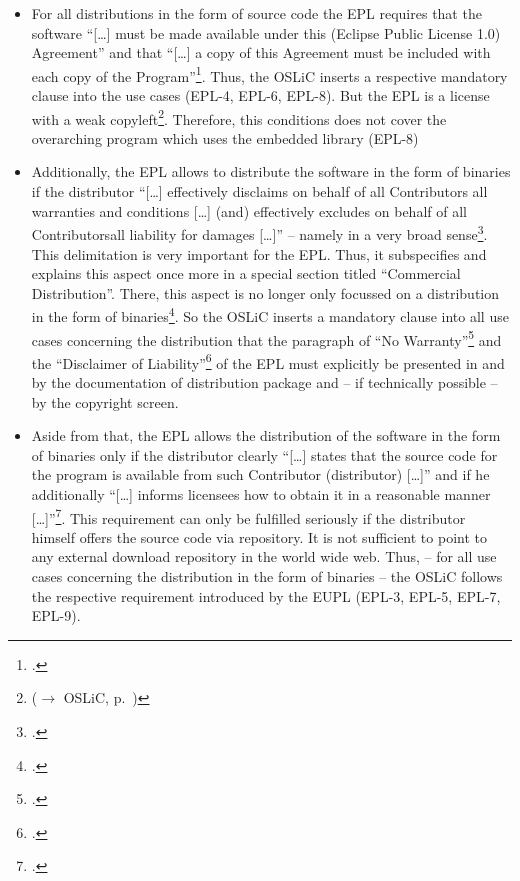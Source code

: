 \begin{itemize}
  \item For all distributions in the form of source code the EPL requires that
  the software \enquote{[\ldots] must be made available under this (Eclipse
  Public License 1.0) Agreement} and that \enquote{[\ldots] a copy of this
  Agreement must be included with each copy of the
  Program}\footcite[cf.][\nopage wp\ §3]{Epl10OsiLicense2005a}. Thus, the OSLiC
  inserts a respective mandatory clause into the use cases (EPL-4, EPL-6,
  EPL-8). But the EPL is a license with a weak copyleft\footnote{($\rightarrow$
  OSLiC, p.\ \pageref{sec:ProtectingPowerOfEpl})}. Therefore, this conditions
  does not cover the overarching program which uses the embedded library (EPL-8)
  
  \item Additionally, the EPL allows to distribute the software in the form
  of binaries if the distributor \enquote{[\ldots] effectively disclaims on
  behalf of all Contributors all warranties and conditions [\ldots] (and)
  effectively excludes on behalf of all Contributorsall liability for damages
  [\ldots]} -- namely in a very broad sense\footcite[cf.][\nopage wp\
  §3]{Epl10OsiLicense2005a}. This delimitation is very important for the EPL.
  Thus, it subspecifies and explains this aspect once more in a special section
  titled \enquote{Commercial Distribution}. There, this aspect is no longer only
  focussed on a distribution in the form of binaries\footcite[cf.][\nopage wp\
  §4]{Epl10OsiLicense2005a}. So the OSLiC inserts a mandatory clause into all
  use cases concerning the distribution that the paragraph of \enquote{No
  Warranty}\footcite[cf.][\nopage wp\ §5]{Epl10OsiLicense2005a} and the
  \enquote{Disclaimer of Liability}\footcite[cf.][\nopage wp\
  §6]{Epl10OsiLicense2005a} of the EPL must explicitly be presented in and by
  the documentation of distribution package
  and -- if technically possible -- by the copyright screen.
  
  \item Aside from that, the EPL allows the distribution of the software in the
  form of binaries only if the distributor clearly \enquote{[\ldots] states that
  the source code for the program is available from such Contributor
  (distributor) [\ldots]} and if he additionally \enquote{[\ldots] informs
  licensees how to obtain it in a reasonable manner
  [\ldots]}\footcite[cf.][\nopage wp\ §3]{Epl10OsiLicense2005a}. This
  requirement can only be fulfilled seriously if the distributor himself offers
  the source code via repository. It is not sufficient to point to any external
  download repository in the world wide web. Thus, -- for all use cases
  concerning the distribution in the form of binaries -- the OSLiC follows the
  respective requirement introduced by the EUPL (EPL-3, EPL-5, EPL-7, EPL-9).
  

\end{itemize}

